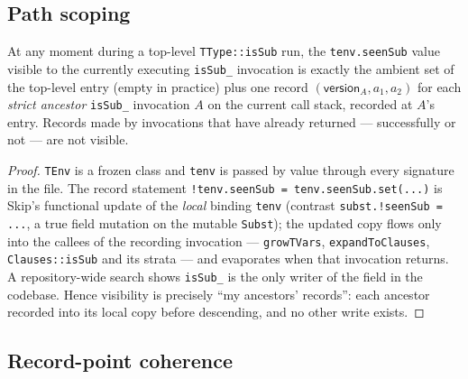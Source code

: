 \documentclass[11pt]{article}
\newcommand{\ver}{\mathsf{version}}
\begin{document}
\subsection{Path scoping}

\begin{lemma}
\label{lem:pathscope}
At any moment during a top-level \texttt{TType::isSub} run, the
\texttt{tenv.seenSub} value visible to the currently executing
\texttt{isSub\_} invocation is exactly the ambient set of the top-level
entry (empty in practice) plus one record
$(\ver_A, a_1, a_2)$ for each \emph{strict ancestor} \texttt{isSub\_}
invocation $A$ on the current call stack, recorded at $A$'s entry.
Records made by invocations that have already returned --- successfully
or not --- are not visible.
\end{lemma}
\begin{proof}
\texttt{TEnv} is a frozen class and \texttt{tenv} is passed by value
through every signature in the file. The record statement
\texttt{!tenv.seenSub = tenv.seenSub.set(...)} is Skip's functional
update of the \emph{local} binding \texttt{tenv} (contrast
\texttt{subst.!seenSub = ...}, a true field mutation on the mutable
\texttt{Subst}); the updated copy flows only into the callees of the
recording invocation --- \texttt{growTVars}, \texttt{expandToClauses},
\texttt{Clauses::isSub} and its strata --- and evaporates when that
invocation returns. A repository-wide search shows \texttt{isSub\_} is the
only writer of the field in the codebase. Hence visibility is precisely
``my ancestors' records'': each ancestor recorded into its local copy
before descending, and no other write exists.
\end{proof}

\subsection{Record-point coherence}
\end{document}
